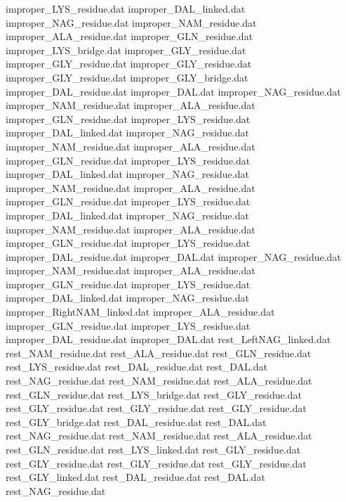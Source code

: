 improper_LYS_residue.dat        
improper_DAL_linked.dat         
improper_NAG_residue.dat        
improper_NAM_residue.dat        
improper_ALA_residue.dat        
improper_GLN_residue.dat        
improper_LYS_bridge.dat         
improper_GLY_residue.dat
improper_GLY_residue.dat
improper_GLY_residue.dat
improper_GLY_residue.dat
improper_GLY_bridge.dat
improper_DAL_residue.dat        
improper_DAL.dat                
improper_NAG_residue.dat        
improper_NAM_residue.dat        
improper_ALA_residue.dat        
improper_GLN_residue.dat        
improper_LYS_residue.dat        
improper_DAL_linked.dat         
improper_NAG_residue.dat        
improper_NAM_residue.dat        
improper_ALA_residue.dat        
improper_GLN_residue.dat        
improper_LYS_residue.dat        
improper_DAL_linked.dat         
improper_NAG_residue.dat        
improper_NAM_residue.dat        
improper_ALA_residue.dat        
improper_GLN_residue.dat        
improper_LYS_residue.dat        
improper_DAL_linked.dat         
improper_NAG_residue.dat        
improper_NAM_residue.dat        
improper_ALA_residue.dat        
improper_GLN_residue.dat        
improper_LYS_residue.dat        
improper_DAL_residue.dat        
improper_DAL.dat                
improper_NAG_residue.dat        
improper_NAM_residue.dat        
improper_ALA_residue.dat        
improper_GLN_residue.dat        
improper_LYS_residue.dat        
improper_DAL_linked.dat         
improper_NAG_residue.dat        
improper_RightNAM_linked.dat    
improper_ALA_residue.dat        
improper_GLN_residue.dat        
improper_LYS_residue.dat        
improper_DAL_residue.dat        
improper_DAL.dat                
rest_LeftNAG_linked.dat         
rest_NAM_residue.dat            
rest_ALA_residue.dat            
rest_GLN_residue.dat            
rest_LYS_residue.dat            
rest_DAL_residue.dat            
rest_DAL.dat                    
rest_NAG_residue.dat            
rest_NAM_residue.dat            
rest_ALA_residue.dat            
rest_GLN_residue.dat            
rest_LYS_bridge.dat             
rest_GLY_residue.dat
rest_GLY_residue.dat
rest_GLY_residue.dat
rest_GLY_residue.dat
rest_GLY_bridge.dat
rest_DAL_residue.dat            
rest_DAL.dat                    
rest_NAG_residue.dat            
rest_NAM_residue.dat            
rest_ALA_residue.dat            
rest_GLN_residue.dat            
rest_LYS_linked.dat             
rest_GLY_residue.dat
rest_GLY_residue.dat
rest_GLY_residue.dat
rest_GLY_residue.dat
rest_GLY_linked.dat
rest_DAL_residue.dat            
rest_DAL.dat                    
rest_NAG_residue.dat            
